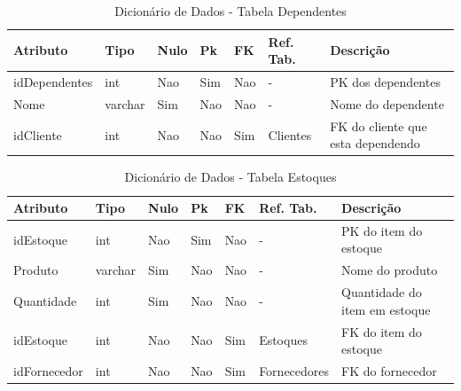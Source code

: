 \documentclass[
	12pt,				%
	openright,			%
	oneside,			%
	a4paper,			%
	chapter=TITLE,		%
	section=TITLE,		%
	english,			%
	brazil				%
	]{abntex2}
\begin{document}
    \begin{table}[htbp]
        \caption{Dicionário de Dados - Tabela Dependentes}
        \label{tb1_dicionario_dados_dependentes}
        \begin{tabular}{|l|l|l|l|l|l|p{3cm}|}
            \hline 
            \textbf{Atributo} & 
            \textbf{Tipo} & 
            \textbf{Nulo} & 
            \textbf{Pk} & 
            \textbf{FK} & 
            \textbf{Ref. Tab.} & 
            \textbf{Descrição} \\ \hline
            idDependentes & int & Nao & Sim & Nao & - & PK dos dependentes \\ \hline
            Nome & varchar & Sim & Nao & Nao & - & Nome do dependente \\ \hline
            idCliente & int & Nao & Nao & Sim & Clientes & FK do cliente que esta dependendo \\ \hline
        \end{tabular}
    \end{table}
    
    \begin{table}[htbp]
        \caption{Dicionário de Dados - Tabela Estoques}
        \label{tb1_dicionario_dados_estoques}
        \begin{tabular}{|l|l|l|l|l|l|p{3cm}|}
            \hline
            \textbf{Atributo} & 
            \textbf{Tipo} & 
            \textbf{Nulo} & 
            \textbf{Pk} & 
            \textbf{FK} & 
            \textbf{Ref. Tab.} & 
            \textbf{Descrição} \\ \hline
            idEstoque & int & Nao & Sim & Nao & - & PK do item do estoque \\ \hline
            Produto & varchar & Sim & Nao & Nao & - & Nome do produto \\ \hline
            Quantidade & int & Sim & Nao & Nao & - & Quantidade do item em estoque \\ \hline
            idEstoque & int & Nao & Nao & Sim & Estoques & FK do item do estoque \\ \hline
            idFornecedor & int & Nao & Nao & Sim & Fornecedores & FK do fornecedor \\ \hline
        \end{tabular}
    \end{table}
    
\end{document}
